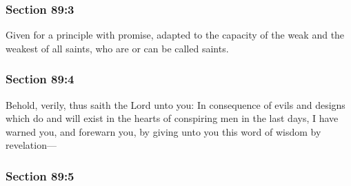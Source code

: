 
	\subsubsection{Section 89:3} %
		\label{DC89-3}

		Given for a principle with promise, adapted to the capacity of the weak and the weakest of all saints, who are or can be called saints.


	\subsubsection{Section 89:4} %
		\label{DC89-4}

		Behold, verily, thus saith the Lord unto you: In consequence of evils and designs which do and will exist in the hearts of conspiring men in the last days, I have warned you, and forewarn you, by giving unto you this word of wisdom by revelation---


	\subsubsection{Section 89:5} %
		\label{DC89-5}

